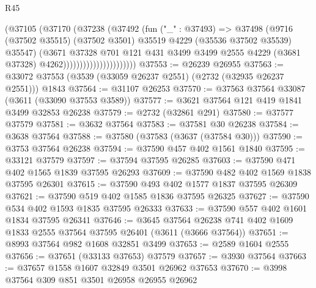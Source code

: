 \begin{lexlean}{R45}
\begin{coremodule}
                                    (@37105
                                      (@37170
                                        (@37238
                                          (@37492
                                            (fun ("_" : @37493) =>
                                            @37498
                                              (@9716
                                                (@37502 @35515)
                                                (@37502 @3501)
                                                @35519
                                                @4229
                                                (@35536 @37502 @35539)
                                                @35547)
                                              (@3671
                                                @37328
                                                @701
                                                @121
                                                @431
                                                @3499
                                                @3499
                                                @2555
                                                @4229
                                                (@3681 @37328)
                                                @4262))))))))))))))))))))))
@37553 := @26239 @26955
@37563 := @33072 @37553 (@3539 (@33059 @26237 @2551) (@2732 (@32935 @26237 @2551))) @1843
@37564 := @31107 @26253
@37570 := @37563 @37564 @33087 (@3611 (@33090 @37553 @3589))
@37577 := @3621 @37564 @121 @419 @1841 @3499 @32853 @26238
@37579 := @2732 (@32861 @291)
@37580 := @37577 @37579
@37581 := @3632 @37564
@37583 := @37581 @30 @26238
@37584 := @3638 @37564
@37588 := @37580 (@37583 (@3637 (@37584 @30)))
@37590 := @3753 @37564 @26238
@37594 := @37590 @457 @402 @1561 @1840
@37595 := @33121 @37579
@37597 := @37594 @37595 @26285
@37603 := @37590 @471 @402 @1565 @1839 @37595 @26293
@37609 := @37590 @482 @402 @1569 @1838 @37595 @26301
@37615 := @37590 @493 @402 @1577 @1837 @37595 @26309
@37621 := @37590 @519 @402 @1585 @1836 @37595 @26325
@37627 := @37590 @534 @402 @1593 @1835 @37595 @26333
@37633 := @37590 @557 @402 @1601 @1834 @37595 @26341
@37646 := @3645
    @37564
    @26238
    @741
    @402
    @1609
    @1833
    @2555
    @37564
    @37595
    @26401
    (@3611 (@3666 @37564))
@37651 := @8993 @37564 @982 @1608 @32851 @3499
@37653 := @2589 @1604 @2555
@37656 := @37651 (@33133 @37653) @37579
@37657 := @3930 @37564
@37663 := @37657 @1558 @1607 @32849 @3501 @26962 @37653
@37670 := @3998 @37564 @309 @851 @3501 @26958 @26955 @26962

\end{coremodule}
\end{lexlean}
